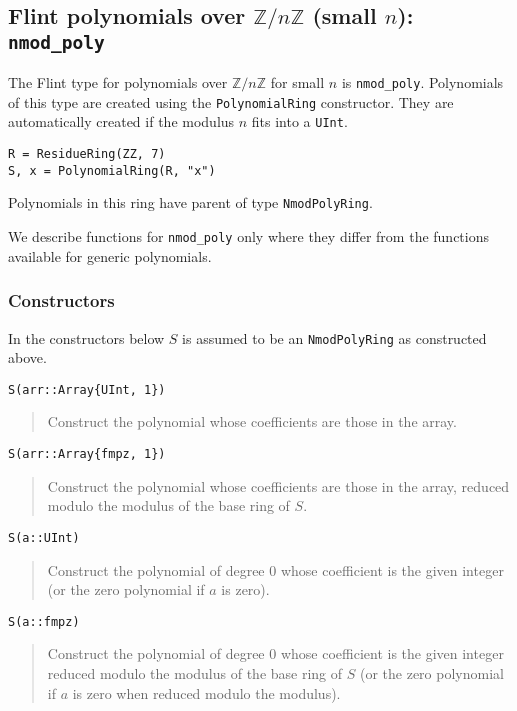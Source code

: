 \documentclass[a4paper,10pt]{article}
\newcommand{\Z}{\mathbb{Z}}
\newcommand{\code}{\lstinline}
\newcommand{\desc}[1]{\vspace{-3mm}\begin{quote}#1\end{quote}}
\begin{document}
{{\subsection{Flint polynomials over $\Z/n\Z$ (small $n$): \code{nmod_poly}}

The Flint type for polynomials over $\Z/n\Z$ for small $n$ is \code{nmod_poly}. Polynomials
of this type are created using the \code{PolynomialRing} constructor. They are automatically
created if the modulus $n$ fits into a \code{UInt}.

\begin{lstlisting}
R = ResidueRing(ZZ, 7)
S, x = PolynomialRing(R, "x")
\end{lstlisting}

Polynomials in this ring have parent of type \code{NmodPolyRing}.

We describe functions for \code{nmod_poly} only where they differ from the functions
available for generic polynomials.

\subsubsection{Constructors}

In the constructors below $S$ is assumed to be an \code{NmodPolyRing} as constructed above.

\begin{lstlisting}
S(arr::Array{UInt, 1})
\end{lstlisting}

\desc{Construct the polynomial whose coefficients are those in the array.}

\begin{lstlisting}
S(arr::Array{fmpz, 1})
\end{lstlisting}

\desc{Construct the polynomial whose coefficients are those in the array, reduced modulo the
modulus of the base ring of $S$.}

\begin{lstlisting}
S(a::UInt)
\end{lstlisting}

\desc{Construct the polynomial of degree $0$ whose coefficient is the given integer (or the
zero polynomial if $a$ is zero).}

\begin{lstlisting}
S(a::fmpz)
\end{lstlisting}

\desc{Construct the polynomial of degree $0$ whose coefficient is the given integer reduced
modulo the modulus of the base ring of $S$ (or the zero polynomial if $a$ is zero when
reduced modulo the modulus).}

}}
\end{document}
